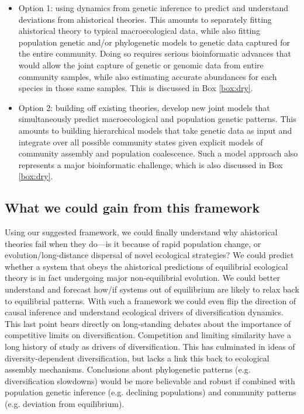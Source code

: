 \documentclass[12pt]{article}
\newcounter{Box}
\begin{document}
\begin{itemize}
\item Option 1: using dynamics from genetic inference to predict and
  understand deviations from ahistorical theories. This amounts to
  separately fitting ahistorical theory to typical macroecological
  data, while also fitting population genetic
  and/or phylogenetic models to genetic data captured
  for the entire community. Doing so requires serious bioinformatic
  advances that would allow the joint capture of genetic or genomic
  data from entire community samples, while also estimating accurate
  abundances for each species in those same samples. This is discussed
  in Box \ref{box:dry}.
\item Option 2: building off existing theories, develop new joint
  models that simultaneously predict macroecological and population
  genetic patterns. This amounts to building hierarchical models that
  take genetic data as input and integrate over all possible community
  states given explicit models of community assembly and population
  coalescence. Such a model approach also represents a major
  bioinformatic challenge, which is also discussed in Box
  \ref{box:dry}.
\end{itemize}
% 
% 
\subsection{What we could gain from this framework}

Using our suggested framework, we could finally understand why ahistorical theories fail when
they do---is it because of rapid population change, or
evolution/long-distance dispersal of novel ecological strategies? We
could predict whether a system that obeys the ahistorical predictions
of equilibrial ecological theory is in fact undergoing major
non-equilibrial evolution. We could better understand and forecast
how/if systems out of equilibrium are likely to relax back to
equilibrial patterns. With such a framework we could even flip the
direction of causal inference and understand ecological drivers of
diversification dynamics. This last point bears directly on
long-standing  debates about the importance of competitive
limits on diversification. Competition and limiting similarity have a
long history of study as drivers of diversification. This has
culminated in ideas of diversity-dependent
diversification\citep{Etienne2012-ky, Rabosky2013-gk, Rabosky2008-bs}, but lacks a
 link this back to ecological assembly
mechanisms. Conclusions about phylogenetic patterns (e.g. diversification
slowdowns) would be more believable and robust if combined with
population genetic inference (e.g. declining populations) and
community patterns (e.g.  deviation from equilibrium).
\end{document}
